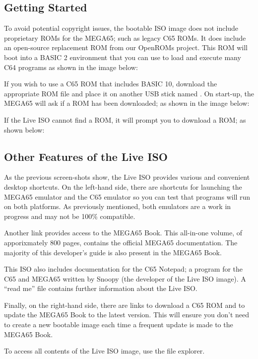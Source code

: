 \subsection{Getting Started}

To avoid potential copyright issues, the bootable ISO image does not include proprietary ROMs for the MEGA65; such as legacy C65 ROMs. It does include an open-source replacement ROM from our OpenROMs project. This ROM will boot into a BASIC 2 environment that you can use to load and execute many C64 programs as shown in the image below:


If you wish to use a C65 ROM that includes BASIC 10, download the appropriate ROM file and place it on another USB stick named . On start-up, the MEGA65 will ask if a ROM has been downloaded; as shown in the image below:


If the Live ISO cannot find a ROM, it will prompt you to download a ROM; as shown below:


\subsection{Other Features of the Live ISO}

As the previous screen-shots show, the Live ISO provides various and convenient desktop shortcuts. On the left-hand side, there are shortcuts for launching the
MEGA65 emulator and the C65 emulator so you can test that programs
will run on both platforms. As previously mentioned, both emulators are a work in progress and may not be 100\% compatible.

Another link provides access to the MEGA65 Book. This all-in-one volume, of apporixmately 800 pages, contains the official MEGA65 documentation. The majority of this developer's guide is also present in the MEGA65 Book.

This ISO also includes documentation for the C65 Notepad; a program for the C65 and MEGA65 written by Snoopy (the developer of the Live ISO image). A ``read me'' file contains further information about the Live ISO.

Finally, on the right-hand side, there are links to download a C65 ROM and to update the MEGA65 Book to the latest version. This will ensure you don't need to create a new bootable image each time a frequent update is made to the MEGA65 Book.

To access all contents of the Live ISO image, use the file explorer.

